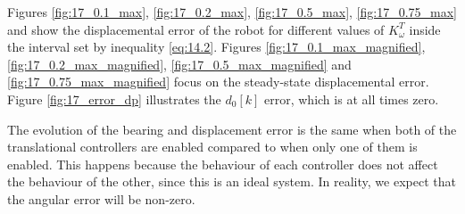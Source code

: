 Figures \ref{fig:17_0.1_max}, \ref{fig:17_0.2_max}, \ref{fig:17_0.5_max},
\ref{fig:17_0.75_max} and show the displacemental error of the
robot for different values of $K_{\omega}^T$ inside the interval set by
inequality \ref{eq:14.2}. Figures \ref{fig:17_0.1_max_magnified},
\ref{fig:17_0.2_max_magnified}, \ref{fig:17_0.5_max_magnified} and
\ref{fig:17_0.75_max_magnified} focus on the steady-state displacemental error.
Figure \ref{fig:17_error_dp} illustrates the $d_0[k]$ error, which is at all
times zero.

The evolution of the bearing and displacement error is the same when both of the
translational controllers are enabled compared to when only one of them is
enabled. This happens because the behaviour of each controller does not affect
the behaviour of the other, since this is an ideal system. In reality, we expect
that the angular error will be non-zero.

\noindent{}

\noindent{}

